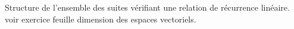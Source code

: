 

Structure de l'ensemble des suites vérifiant une relation de récurrence linéaire.
voir exercice feuille dimension des espaces vectoriels.
